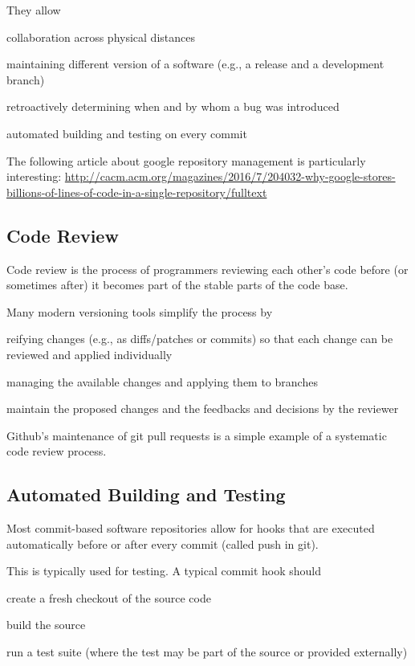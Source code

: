 They allow
\begin{compactitem}
 \item collaboration across physical distances
 \item maintaining different version of a software (e.g., a release and a development branch)
 \item retroactively determining when and by whom a bug was introduced
 \item automated building and testing on every commit
\end{compactitem}

The following article about google repository management is particularly interesting:
\url{http://cacm.acm.org/magazines/2016/7/204032-why-google-stores-billions-of-lines-of-code-in-a-single-repository/fulltext}

\subsection{Code Review}

Code review is the process of programmers reviewing each other's code before (or sometimes after) it becomes part of the stable parts of the code base.

Many modern versioning tools simplify the process by
\begin{compactitem}
 \item reifying changes (e.g., as diffs/patches or commits) so that each change can be reviewed and applied individually
 \item managing the available changes and applying them to branches
 \item maintain the proposed changes and the feedbacks and decisions by the reviewer
\end{compactitem}

Github's maintenance of git pull requests is a simple example of a systematic code review process.

\subsection{Automated Building and Testing}

Most commit-based software repositories allow for hooks that are executed automatically before or after every commit (called push in git).

This is typically used for testing.
A typical commit hook should
\begin{compactitem}
 \item create a fresh checkout of the source code
 \item build the source
 \item run a test suite (where the test may be part of the source or provided externally)
\end{compactitem}

